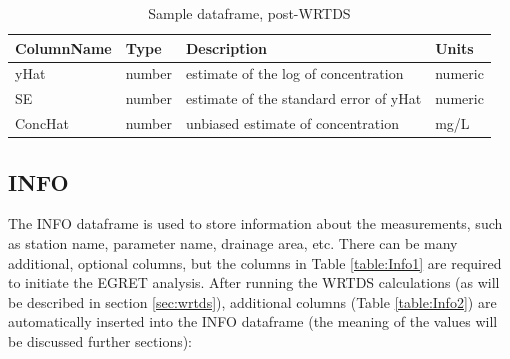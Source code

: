 \documentclass[a4paper,11pt]{article}\usepackage[]{graphicx}\usepackage[]{color}
\begin{document}
\begin{table}[!ht]
\centering
\caption{Sample dataframe, post-WRTDS} 
\label{table:Sample2}
\begin{tabular}{llll}
  \hline
ColumnName & Type & Description & Units \\ 
  \hline
yHat\footnotemark[2] & number & estimate of the log of concentration & numeric \\ 
  SE\footnotemark[2] & number & estimate of the standard error of yHat & numeric \\ 
  ConcHat\footnotemark[2] & number & unbiased estimate of concentration & mg/L \\ 
   \hline
\end{tabular}
\end{table}


\FloatBarrier
\pagebreak


\subsection{INFO}
\label{sec:dataframesINFO}
The INFO dataframe is used to store information about the measurements, such as station name, parameter name, drainage area, etc. There can be many additional, optional columns, but the columns in Table \ref{table:Info1} are required to initiate the EGRET analysis. After running the WRTDS calculations (as will be described in section \ref{sec:wrtds}), additional columns (Table \ref{table:Info2}) are automatically inserted into the INFO dataframe (the meaning of the values will be discussed further sections):
\end{document}
